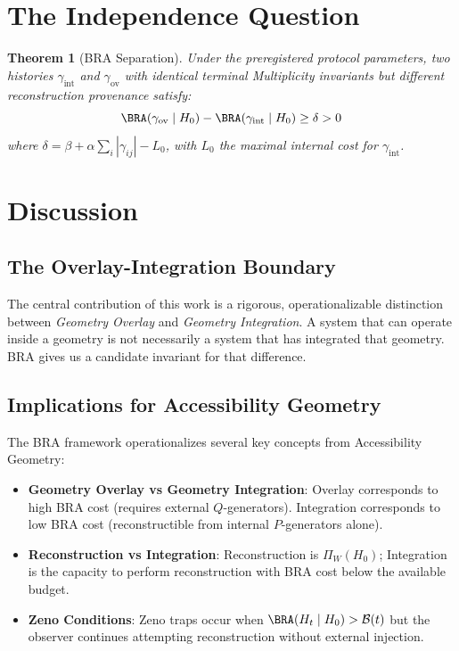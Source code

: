 \documentclass[12pt]{article}
\theoremstyle{plain}
\newtheorem{theorem}{Theorem}[section]
\theoremstyle{definition}
\theoremstyle{remark}
\begin{document}
\section{The Independence Question}


\begin{quote}
\end{quote}

\begin{theorem}[BRA Separation]
\statuslean
Under the preregistered protocol parameters, two histories $\gamma_{\text{int}}$ and $\gamma_{\text{ov}}$ with identical terminal Multiplicity invariants but different reconstruction provenance satisfy:
\[
\BRA(\gamma_{\text{ov}} \mid H_0) - \BRA(\gamma_{\text{int}} \mid H_0) \ge \delta > 0
\]
where $\delta = \beta + \alpha\sum_i |\gamma_{ij}| - L_0$, with $L_0$ the maximal internal cost for $\gamma_{\text{int}}$.
\end{theorem}

\section{Discussion}

\subsection{The Overlay-Integration Boundary}

The central contribution of this work is a rigorous, operationalizable distinction between \emph{Geometry Overlay} and \emph{Geometry Integration}. A system that can operate inside a geometry is not necessarily a system that has integrated that geometry. BRA gives us a candidate invariant for that difference.

\subsection{Implications for Accessibility Geometry}

The BRA framework operationalizes several key concepts from Accessibility Geometry:

\begin{itemize}
    \item \textbf{Geometry Overlay vs Geometry Integration}: Overlay corresponds to high BRA cost (requires external $Q$-generators). Integration corresponds to low BRA cost (reconstructible from internal $P$-generators alone).
    \item \textbf{Reconstruction vs Integration}: Reconstruction is $\Pi_W(H_0)$; Integration is the capacity to perform reconstruction with BRA cost below the available budget.
    \item \textbf{Zeno Conditions}: Zeno traps occur when $\BRA(H_t \mid H_0) > \mathcal{B}(t)$ but the observer continues attempting reconstruction without external injection.
\end{itemize}
\end{document}
